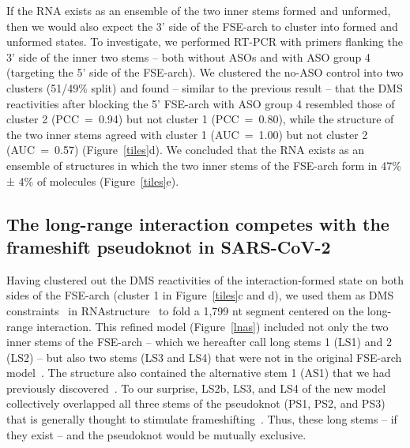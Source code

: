 \documentclass[main.tex]{subfiles}
\begin{document}
If the RNA exists as an ensemble of the two inner stems formed and unformed, then we would also expect the 3' side of the FSE-arch to cluster into formed and unformed states.
To investigate, we performed RT-PCR with primers flanking the 3' side of the inner two stems -- both without ASOs and with ASO group 4 (targeting the 5' side of the FSE-arch).
We clustered the no-ASO control into two clusters (51/49\% split) and found -- similar to the previous result -- that the DMS reactivities after blocking the 5' FSE-arch with ASO group 4 resembled those of cluster 2 (PCC~=~0.94) but not cluster 1 (PCC~=~0.80), while the structure of the two inner stems agreed with cluster 1 (AUC~=~1.00) but not cluster 2 (AUC~=~0.57) (Figure~\ref{tiles}d).
We concluded that the RNA exists as an ensemble of structures in which the two inner stems of the FSE-arch form in 47\% ± 4\% of molecules (Figure~\ref{tiles}e).


\subsection{The long-range interaction competes with the frameshift pseudoknot in SARS-CoV-2}

Having clustered out the DMS reactivities of the interaction-formed state on both sides of the FSE-arch (cluster 1 in Figure~\ref{tiles}c and d), we used them as DMS constraints~\cite{Cordero2012} in RNAstructure~\cite{Mathews2004a} to fold a 1,799 nt segment centered on the long-range interaction.
This refined model (Figure~\ref{lnas}) included not only the two inner stems of the FSE-arch -- which we hereafter call long stems 1 (LS1) and 2 (LS2) -- but also two stems (LS3 and LS4) that were not in the original FSE-arch model~\cite{Ziv2020}.
The structure also contained the alternative stem 1 (AS1) that we had previously discovered~\cite{Lan2022}.
To our surprise, LS2b, LS3, and LS4 of the new model collectively overlapped all three stems of the pseudoknot (PS1, PS2, and PS3) that is generally thought to stimulate frameshifting~\cite{Kelly2020,KZhang2021,Jones2022}.
Thus, these long stems -- if they exist -- and the pseudoknot would be mutually exclusive.
\end{document}
